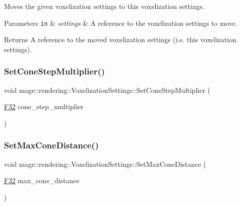 Moves the given voxelization settings to this voxelization settings.


\begin{DoxyParams}[1]{Parameters}
\mbox{\tt in}  & {\em settings} & A reference to the voxelization settings to move. \\
\hline
\end{DoxyParams}
\begin{DoxyReturn}{Returns}
A reference to the moved voxelization settings (i.\+e. this voxelization settings). 
\end{DoxyReturn}
\hypertarget{classmage_1_1rendering_1_1_voxelization_settings_a9eafb3795d3e8248196dd7e9c6d32671}{}\label{classmage_1_1rendering_1_1_voxelization_settings_a9eafb3795d3e8248196dd7e9c6d32671} 
\subsubsection{\texorpdfstring{Set\+Cone\+Step\+Multiplier()}{SetConeStepMultiplier()}}
{\footnotesize\ttfamily void mage\+::rendering\+::\+Voxelization\+Settings\+::\+Set\+Cone\+Step\+Multiplier (\begin{DoxyParamCaption}\item[{\hyperlink{namespacemage_aa97e833b45f06d60a0a9c4fc22ae02c0}{F32}}]{cone\+\_\+step\+\_\+multiplier }\end{DoxyParamCaption})\hspace{0.3cm}{\ttfamily [noexcept]}}

\hypertarget{classmage_1_1rendering_1_1_voxelization_settings_a137c4c2186b5034f546d0b876cd0633e}{}\label{classmage_1_1rendering_1_1_voxelization_settings_a137c4c2186b5034f546d0b876cd0633e} 
\subsubsection{\texorpdfstring{Set\+Max\+Cone\+Distance()}{SetMaxConeDistance()}}
{\footnotesize\ttfamily void mage\+::rendering\+::\+Voxelization\+Settings\+::\+Set\+Max\+Cone\+Distance (\begin{DoxyParamCaption}\item[{\hyperlink{namespacemage_aa97e833b45f06d60a0a9c4fc22ae02c0}{F32}}]{max\+\_\+cone\+\_\+distance }\end{DoxyParamCaption})\hspace{0.3cm}{\ttfamily [noexcept]}}

